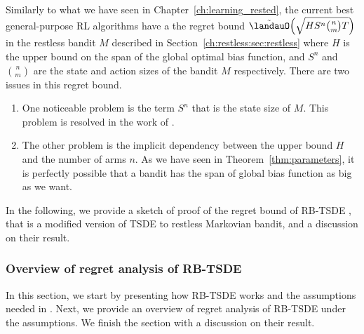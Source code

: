 Similarly to what we have seen in Chapter~\ref{ch:learning_rested}, the current best general-purpose RL algorithms have a the regret bound $\tilde{\landauO}\Bigl(\sqrt{HS^n{n \choose m}T}\Bigr)$ in the restless bandit $M$ described in Section~\ref{ch:restless:sec:restless} where $H$ is the upper bound on the span of the global optimal bias function, and $S^n$ and ${n \choose m}$ are the state and action sizes of the bandit $M$ respectively.
There are two issues in this regret bound.
\begin{enumerate}[label=(\alph*)]
    \item \label{it:state_exponential} One noticeable problem is the term $S^n$ that is the state size of $M$. This problem is resolved in the work of \cite{ortner2012regret, jung2019thompson, akbarzadeh2022learning}.
    \item \label{it:diameter_exponential} The other problem is the implicit dependency between the upper bound $H$ and the number of arms $n$. As we have seen in Theorem~\ref{thm:parameters}, it is perfectly possible that a bandit has the span of global bias function as big as we want.
\end{enumerate}


In the following, we provide a sketch of proof of the regret bound of RB-TSDE \cite{akbarzadeh2022learning}, that is a modified version of TSDE \cite{ouyang2017learning} to restless Markovian bandit, and a discussion on their result.


\subsubsection{Overview of regret analysis of RB-TSDE {\cite{akbarzadeh2022learning}}}

In this section, we start by presenting how RB-TSDE \cite{akbarzadeh2022learning} works and the assumptions needed in \cite{akbarzadeh2022learning}. Next, we provide an overview of regret analysis of RB-TSDE under the assumptions. We finish the section with a discussion on their result.

